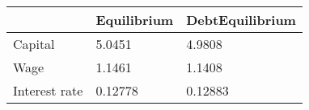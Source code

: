 \begin{tabular}{lll}
& Equilibrium & DebtEquilibrium \\ 
\hline 
Capital & 5.0451 & 4.9808 \\ 
Wage & 1.1461 & 1.1408 \\ 
Interest rate & 0.12778 & 0.12883 \\ 
\hline 
\end{tabular}